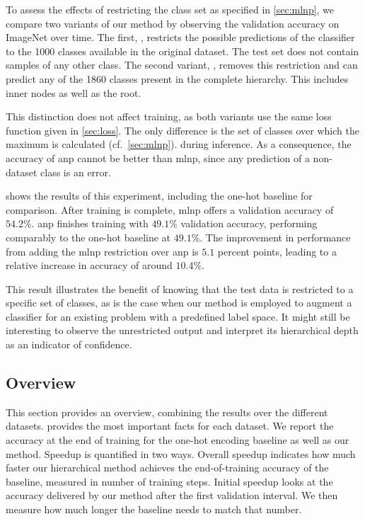 \documentclass[10pt,twocolumn,letterpaper]{article}
\begin{document}
To assess the effects of restricting the class set as specified in \cref{sec:mlnp}, we compare two variants
of our method by observing
the validation accuracy on ImageNet over time. The first, , restricts the possible
predictions of the classifier to the 1000 classes available in the original dataset. The test set does
not contain samples of any other class. The second variant, , removes this restriction and
can predict any of the 1860 classes present in the complete hierarchy. This includes inner nodes as
well as the root.

This distinction does not affect training, as both variants use the same loss function given in
\cref{sec:loss}. The only difference is the set of classes over which the maximum is calculated (cf.~\cref{sec:mlnp}).
during inference. As a consequence, the accuracy of \gls{anp} cannot be better
than \gls{mlnp}, since any prediction of a non-dataset class is an error.

 shows the results of this experiment, including the one-hot baseline for
comparison. After training is complete, \gls{mlnp} offers a validation accuracy of $54.2\%$.
\Gls{anp} finishes training with $49.1\%$ validation accuracy, performing comparably to the one-hot baseline at $49.1\%$.
The improvement in performance from adding the \gls{mlnp} restriction over \gls{anp} is $5.1$ percent points, leading to a relative increase in
accuracy of around $10.4\%$.

This result illustrates the benefit of knowing that the test data is restricted
to a specific set of classes, as is the case when our method is employed to augment a classifier
for an existing problem with a predefined label space. It might still be interesting
to observe the unrestricted output and interpret its hierarchical depth as an indicator of confidence.

\subsection{Overview}
\label{sec:exp-overview}

This section provides an overview, combining the results over the different datasets.
 provides the most important facts for each dataset. We report
the accuracy at the end of training for the one-hot encoding baseline as well as our
method. Speedup is quantified in two ways. Overall speedup indicates how much faster
our hierarchical method achieves the end-of-training accuracy of the baseline,
measured in number of training steps. Initial speedup looks at the accuracy
delivered by our method after the first validation interval. We then measure
how much longer the baseline needs to match that number.
\end{document}
